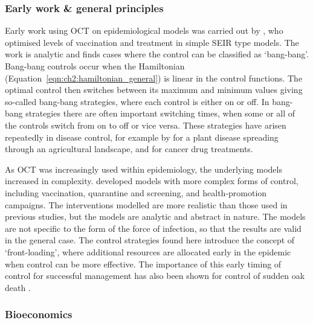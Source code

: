 \subsubsection{Early work \& general principles}

Early work using OCT on epidemiological models was carried out by \citet{sethi_optimal_1978}, who optimised levels of vaccination and treatment in simple SEIR type models. The work is analytic and finds cases where the control can be classified as `bang-bang'. Bang-bang controls occur when the Hamiltonian (Equation~\ref{eqn:ch2:hamiltonian_general}) is linear in the control functions. The optimal control then switches between its maximum and minimum values giving so-called bang-bang strategies, where each control is either on or off. In bang-bang strategies there are often important switching times, when some or all of the controls switch from on to off or vice versa. These strategies have arisen repeatedly in disease control, for example by \citet{forster_optimizing_2007} for a plant disease spreading through an agricultural landscape, and \citet{panetta_optimal_2003} for cancer drug treatments.

As OCT was increasingly used within epidemiology, the underlying models increased in complexity. \citet{behncke_optimal_2000} developed models with more complex forms of control, including vaccination, quarantine and screening, and health-promotion campaigns. The interventions modelled are more realistic than those used in previous studies, but the models are analytic and abstract in nature. The models are not specific to the form of the force of infection, so that the results are valid in the general case. The control strategies found here introduce the concept of `front-loading', where additional resources are allocated early in the epidemic when control can be more effective. The importance of this early timing of control for successful management has also been shown for control of sudden oak death \citep{cunniffe_modelling_2016}.

\subsubsection{Bioeconomics}

